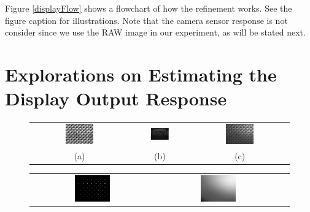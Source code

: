 \documentclass{report}
\begin{document}
Figure \ref{displayFlow} shows a flowchart of how the refinement works. See the figure caption for illustrations. Note that the camera sensor response is not consider since we use the RAW image in our experiment, as will be stated next. 

\section{Explorations on Estimating the Display Output Response}

\begin{figure}
\centering
\begin{tabular}{ccc}
\includegraphics[width=0.3\textwidth]{images/display-pattern.png}&
\includegraphics[width=0.343\textwidth]{images/display-photo.png}&
\includegraphics[width=0.3\textwidth]{images/rendered.png}\\
(a) & (b) & (c)
\end{tabular}
\begin{tabular}{ccc}
\includegraphics[width=0.3\textwidth]{images/rendered-sample.png}&
\includegraphics[width=0.3\textwidth]{images/fitted-gray.png}&

\end{tabular}
\end{figure}
\end{document}
